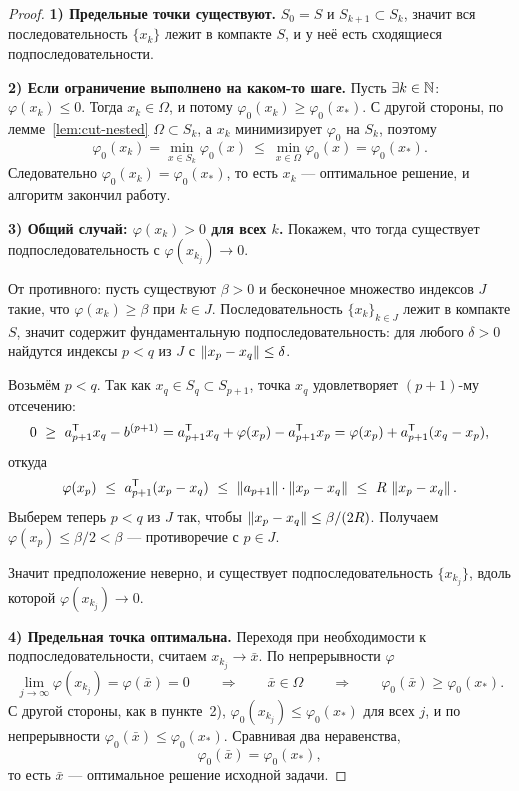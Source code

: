 \begin{proof}
\textbf{1) Предельные точки существуют.} $S_0 = S$ и $S_{k+1} \subset S_k$,
значит вся последовательность $\{x_k\}$ лежит в компакте $S$, и у неё есть
сходящиеся подпоследовательности.

\medskip
\textbf{2) Если ограничение выполнено на каком-то шаге.} Пусть
$\exists k \in \mathbb{N}$: $\varphi(x_k) \le 0$. Тогда $x_k \in \Omega$, и потому
$\varphi_0(x_k) \ge \varphi_0(x_*)$. С другой стороны, по
лемме~\ref{lem:cut-nested} $\Omega \subset S_k$, а $x_k$ минимизирует
$\varphi_0$ на $S_k$, поэтому
\[
  \varphi_0(x_k) = \min_{x \in S_k} \varphi_0(x)
  \ \le\ \min_{x \in \Omega} \varphi_0(x) = \varphi_0(x_*) .
\]
Следовательно $\varphi_0(x_k) = \varphi_0(x_*)$, то есть $x_k$ — оптимальное
решение, и алгоритм закончил работу.

\medskip
\textbf{3) Общий случай: $\varphi(x_k) > 0$ для всех $k$.} Покажем, что тогда
существует подпоследовательность с $\varphi(x_{k_j}) \to 0$.

От противного: пусть существуют $\beta > 0$ и бесконечное множество индексов
$J$ такие, что $\varphi(x_k) \ge \beta$ при $k \in J$. Последовательность
$\{x_k\}_{k \in J}$ лежит в компакте $S$, значит содержит фундаментальную
подпоследовательность: для любого $\delta > 0$ найдутся индексы $p < q$ из $J$ с
$\left\lVert x_p - x_q \right\rVert \le \delta$.

Возьмём $p < q$. Так как $x_q \in S_q \subset S_{p+1}$, точка $x_q$
удовлетворяет $(p{+}1)$-му отсечению:
\[
  0 \ \ge\ a_{p+1}^{\mathsf{T}} x_q - b^{(p+1)}
  = a_{p+1}^{\mathsf{T}} x_q + \varphi(x_p) - a_{p+1}^{\mathsf{T}} x_p
  = \varphi(x_p) + a_{p+1}^{\mathsf{T}} (x_q - x_p) ,
\]
откуда
\[
  \varphi(x_p) \ \le\ a_{p+1}^{\mathsf{T}} (x_p - x_q)
  \ \le\ \left\lVert a_{p+1} \right\rVert \cdot \left\lVert x_p - x_q \right\rVert
  \ \le\ R\,\left\lVert x_p - x_q \right\rVert .
\]
Выберем теперь $p < q$ из $J$ так, чтобы $\left\lVert x_p - x_q \right\rVert \le \beta/(2R)$.
Получаем $\varphi(x_p) \le \beta/2 < \beta$ — противоречие с $p \in J$.

Значит предположение неверно, и существует подпоследовательность $\{x_{k_j}\}$,
вдоль которой $\varphi(x_{k_j}) \to 0$.

\medskip
\textbf{4) Предельная точка оптимальна.} Переходя при необходимости к
подпоследовательности, считаем $x_{k_j} \to \bar{x}$. По непрерывности
$\varphi$
\[
  \lim_{j \to \infty} \varphi(x_{k_j}) = \varphi(\bar{x}) = 0
  \qquad\Longrightarrow\qquad \bar{x} \in \Omega
  \qquad\Longrightarrow\qquad \varphi_0(\bar{x}) \ge \varphi_0(x_*) .
\]
С другой стороны, как в пункте~2), $\varphi_0(x_{k_j}) \le \varphi_0(x_*)$ для
всех $j$, и по непрерывности $\varphi_0(\bar{x}) \le \varphi_0(x_*)$. Сравнивая
два неравенства,
\[
  \varphi_0(\bar{x}) = \varphi_0(x_*) ,
\]
то есть $\bar{x}$ — оптимальное решение исходной задачи.
\end{proof}

